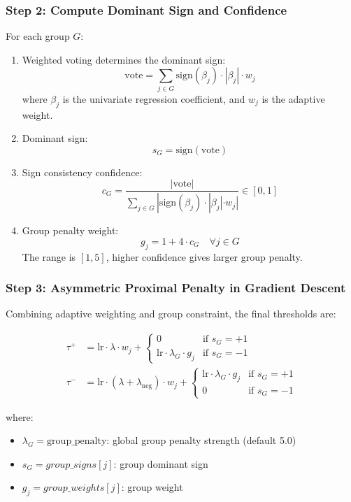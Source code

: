 \documentclass{article}
\begin{document}
\subsubsection{Step 2: Compute Dominant Sign and Confidence}

For each group $G$:

\begin{enumerate}
\item Weighted voting determines the dominant sign:
\[
\text{vote} = \sum_{j \in G} \mathrm{sign}(\beta_j) \cdot |\beta_j| \cdot w_j
\]
where $\beta_j$ is the univariate regression coefficient, and $w_j$ is the adaptive weight.

\item Dominant sign:
\[
\boxed{
s_G = \mathrm{sign}(\text{vote})
}
\]

\item Sign consistency confidence:
\[
\boxed{
c_G = \frac{|\text{vote}|}{\sum_{j \in G} |\mathrm{sign}(\beta_j) \cdot |\beta_j| \cdot w_j|} \in [0, 1]
}
\]

\item Group penalty weight:
\[
\boxed{
g_j = 1 + 4 \cdot c_G \quad \forall j \in G
}
\]
The range is $[1, 5]$, higher confidence gives larger group penalty.
\end{enumerate}

\subsubsection{Step 3: Asymmetric Proximal Penalty in Gradient Descent}

Combining adaptive weighting and group constraint, the final thresholds are:

\[
\boxed{
\begin{aligned}
\tau^+ &= \text{lr} \cdot \lambda \cdot w_j +
\begin{cases}
0 & \text{if } s_G = +1 \\
\text{lr} \cdot \lambda_G \cdot g_j & \text{if } s_G = -1
\end{cases} \\[1em]
\tau^- &= \text{lr} \cdot (\lambda + \lambda_{\text{neg}}) \cdot w_j +
\begin{cases}
\text{lr} \cdot \lambda_G \cdot g_j & \text{if } s_G = +1 \\
0 & \text{if } s_G = -1
\end{cases}
\end{aligned}
}
\]

where:
\begin{itemize}
\item $\lambda_G = \text{group\_penalty}$: global group penalty strength (default 5.0)
\item $s_G = group\_signs[j]$: group dominant sign
\item $g_j = group\_weights[j]$: group weight
\end{itemize}
\end{document}
